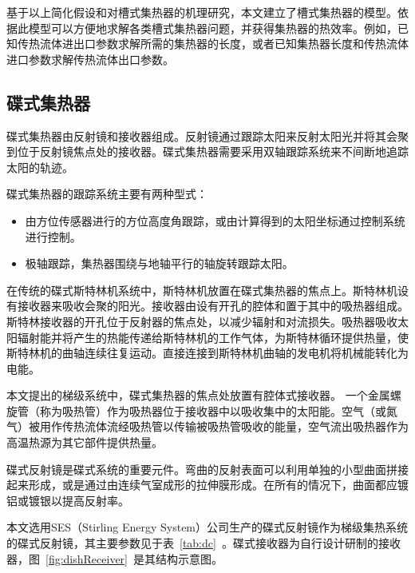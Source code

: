 基于以上简化假设和对槽式集热器的机理研究，本文建立了槽式集热器的模型。依据此模型可以方便地求解各类槽式集热器问题，并获得集热器的热效率。例如，已知传热流体进出口参数求解所需的集热器的长度，或者已知集热器长度和传热流体进口参数求解传热流体出口参数。

\subsection{碟式集热器}
\label{sec:pdc}

碟式集热器由反射镜和接收器组成。反射镜通过跟踪太阳来反射太阳光并将其会聚到位于反射镜焦点处的接收器。碟式集热器需要采用双轴跟踪系统来不间断地追踪太阳的轨迹。

碟式集热器的跟踪系统主要有两种型式\cite{Adkins1987}：
\begin{itemize}
  \item 由方位传感器进行的方位高度角跟踪，或由计算得到的太阳坐标通过控制系统进行控制。
  \item 极轴跟踪，集热器围绕与地轴平行的轴旋转跟踪太阳。
\end{itemize}

在传统的碟式斯特林机系统中，斯特林机放置在碟式集热器的焦点上。斯特林机设有接收器来吸收会聚的阳光。接收器由设有开孔的腔体和置于其中的吸热器组成。斯特林接收器的开孔位于反射器的焦点处，以减少辐射和对流损失。吸热器吸收太阳辐射能并将产生的热能传递给斯特林机的工作气体，为斯特林循环提供热量，使斯特林机的曲轴连续往复运动。直接连接到斯特林机曲轴的发电机将机械能转化为电能。

本文提出的梯级系统中，碟式集热器的焦点处放置有腔体式接收器。 一个金属螺旋管（称为吸热管）作为吸热器位于接收器中以吸收集中的太阳能。空气（或氮气）被用作传热流体流经吸热管以传输被吸热管吸收的能量，空气流出吸热器作为高温热源为其它部件提供热量。

碟式反射镜是碟式系统的重要元件。弯曲的反射表面可以利用单独的小型曲面拼接起来形成，或是通过由连续气室成形的拉伸膜形成。在所有的情况下，曲面都应镀铝或镀银以提高反射率。

本文选用SES（Stirling Energy System）公司生产的碟式反射镜作为梯级集热系统的碟式反射镜，其主要参数见于表~\ref{tab:dc}~。碟式接收器为自行设计研制的接收器，图~\ref{fig:dishReceiver}~是其结构示意图。

